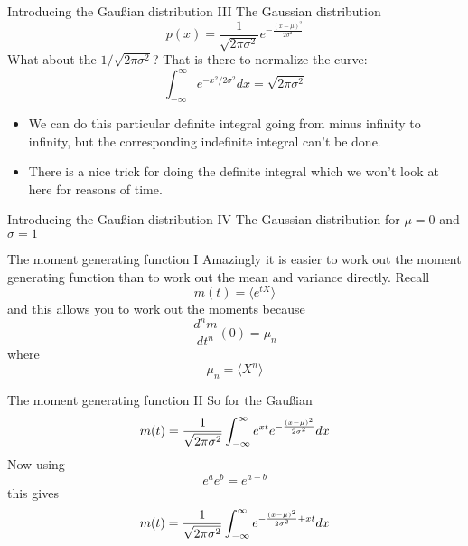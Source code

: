 \documentclass{beamer}
\begin{document}
\begin{frame}{Introducing the Gau\ss{}ian distribution III}
The Gaussian distribution
\color{reddish}
$$
p(x)=\frac{1}{\sqrt{2\pi\sigma^2}}e^{-\frac{(x-\mu)^2}{2\sigma^2}}
$$
\color{black}
What about the \color{reddish}$1/\sqrt{2\pi\sigma^2}$\color{black}{}? That is there to normalize the curve:
\color{purple}
$$
\int_{-\infty}^\infty e^{-x^2/2\sigma^2}dx=\sqrt{2\pi\sigma^2}
$$
\color{black}
\begin{itemize}
\item We can do this particular definite integral
going from minus infinity to infinity, but the corresponding
indefinite integral can't be done.
\item There is a nice trick for doing the definite integral which we won't
  look at here for reasons of time.
\end{itemize}
\end{frame}

\begin{frame}{Introducing the Gau\ss{}ian distribution IV}
The Gaussian distribution for \color{reddish}$\mu=0$\color{black}{} and \color{reddish}$\sigma=1$\color{black}{}
\begin{center}

\end{center}

\end{frame}


\begin{frame}{The moment generating function I}
Amazingly it is easier to work out the moment generating function than to work out the mean and variance directly. Recall
\color{reddish}
$$
m(t)=\langle e^{tX}\rangle
$$
\color{black}
and this allows you to work out the moments because
\color{reddish}
$$
\frac{d^nm}{dt^n}(0)=\mu_n
$$
\color{black}
where 
\color{reddish}
$$
\mu_n=\langle X^n\rangle
$$
\color{black}{}

\end{frame}



\begin{frame}{The moment generating function II}
So for the Gau\ss{}ian
\color{reddish}
$$
m(t)=\frac{1}{\sqrt{2\pi\sigma^2}}\int_{-\infty}^\infty \color{greenish}e^{xt}e^{-\frac{(x-\mu)^2}{2\sigma^2}}\color{reddish}dx
$$
\color{black}
Now using
\color{greenish}
$$
e^ae^b=e^{a+b}
$$
\color{black}
this gives 
\color{reddish}
$$
m(t)=\frac{1}{\sqrt{2\pi\sigma^2}}\int_{-\infty}^\infty \color{greenish}e^{-\frac{(x-\mu)^2}{2\sigma^2}+xt}\color{reddish}dx
$$

\end{frame}
\end{document}
